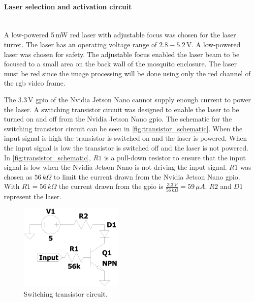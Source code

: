 \paragraph{Laser selection and activation circuit}\label{par:laser_activation}\hfill\\
A low-powered 5\,mW red laser with adjustable focus was chosen for the laser turret. The laser has an operating voltage range of $2.8 - 5.2$\,V. A low-powered laser was chosen for safety. The adjustable focus enabled the laser beam to be focused to a small area on the back wall of the mosquito enclosure. The laser must be red since the image processing will be done using only the red channel of the \gls{rgb} video frame.

The 3.3\,V \gls{gpio} of the Nvidia Jetson Nano cannot supply enough current to power the laser. A switching transistor circuit was designed to enable the laser to be turned on and off from the Nvidia Jetson Nano \gls{gpio}. The schematic for the switching transistor circuit can be seen in \autoref{fig:transistor_schematic}.  When the input signal is high the transistor is switched on and the laser is powered. When the input signal is low the transistor is switched off and the laser is not powered. In \autoref{fig:transistor_schematic}, $R1$ is a pull-down resistor to ensure that the input signal is low when the Nvidia Jetson Nano is not driving the input signal. $R1$ was chosen as $56\,k\Omega$ to limit the current drawn from the Nvidia Jetson Nano \gls{gpio}. With $R1 = 56\,k\Omega$ the current drawn from the \gls{gpio} is $\frac{3.3\,V}{56\,k\Omega} = 59\,\mu A$. $R2$ and $D1$ represent the laser.
\begin{figure}[!htb]
  \centering
  \includegraphics[width=0.45\textwidth]{figures/hardware_design/laser_transistor_schematic.pdf}
  \caption{Switching transistor circuit.}
  \label{fig:transistor_schematic}
\end{figure}


